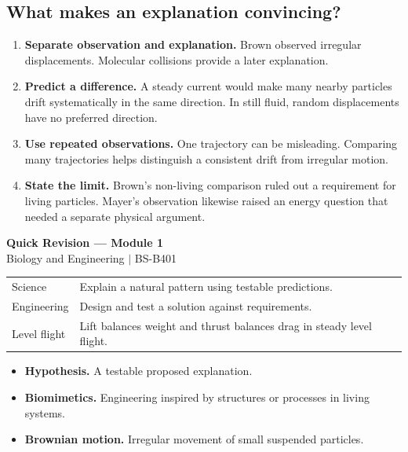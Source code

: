 \documentclass[12pt,a4paper]{article}
\renewcommand{\arraystretch}{1.45}
\begin{document}
\subsection{What makes an explanation convincing?}
\begin{enumerate}[leftmargin=*, itemsep=2pt]
  \item \textbf{Separate observation and explanation.} Brown observed irregular displacements. Molecular collisions provide a later explanation.
  \item \textbf{Predict a difference.} A steady current would make many nearby particles drift systematically in the same direction. In still fluid, random displacements have no preferred direction.
  \item \textbf{Use repeated observations.} One trajectory can be misleading. Comparing many trajectories helps distinguish a consistent drift from irregular motion.
  \item \textbf{State the limit.} Brown's non-living comparison ruled out a requirement for living particles. Mayer's observation likewise raised an energy question that needed a separate physical argument.
\end{enumerate}

\newpage
\begin{center}
  {\large\bfseries\color{myred} Quick Revision --- Module 1}\\[3pt]
  {\small\color{mydark} Biology and Engineering $|$ BS-B401}
\end{center}
\noindent{\color{myred}\rule{\linewidth}{1.2pt}}\par\vspace{4pt}

\begin{tcolorbox}[formulabox, title={Key Concepts at a Glance}]
\renewcommand{\arraystretch}{1.35}
\noindent\begin{tabularx}{\linewidth}{B{4.5cm}Y}
Science & Explain a natural pattern using testable predictions. \\[3pt]
Engineering & Design and test a solution against requirements. \\[3pt]
Level flight & Lift balances weight and thrust balances drag in steady level flight. \\[3pt]
\end{tabularx}\par
\end{tcolorbox}

\begin{tcolorbox}[defbox, title={One-Line Definitions}]
\begin{itemize}[leftmargin=*, itemsep=3pt, topsep=4pt]
  \item \textbf{Hypothesis.} A testable proposed explanation.
  \item \textbf{Biomimetics.} Engineering inspired by structures or processes in living systems.
  \item \textbf{Brownian motion.} Irregular movement of small suspended particles.
\end{itemize}
\end{tcolorbox}
\end{document}
